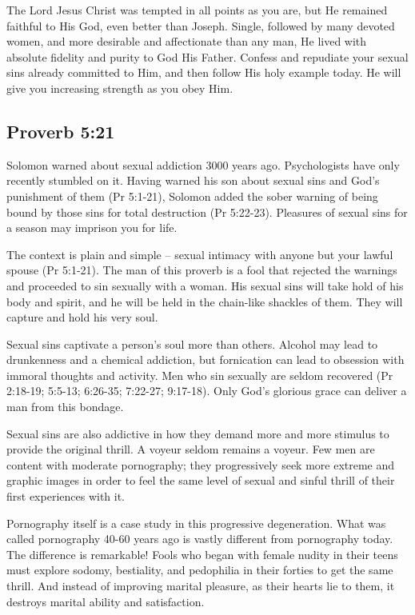 The Lord Jesus Christ was tempted in all points as you are, but He remained faithful to His God, even better than Joseph. Single, followed by many devoted women, and more desirable and affectionate than any man, He lived with absolute fidelity and purity to God His Father. Confess and repudiate your sexual sins already committed to Him, and then follow His holy example today. He will give you increasing strength as you obey Him.

\subsection{Proverb 5:21}
Solomon warned about sexual addiction 3000 years ago. Psychologists have only recently stumbled on it. Having warned his son about sexual sins and God’s punishment of them (Pr 5:1-21), Solomon added the sober warning of being bound by those sins for total destruction (Pr 5:22-23). Pleasures of sexual sins for a season may imprison you for life.

The context is plain and simple – sexual intimacy with anyone but your lawful spouse (Pr 5:1-21). The man of this proverb is a fool that rejected the warnings and proceeded to sin sexually with a woman. His sexual sins will take hold of his body and spirit, and he will be held in the chain-like shackles of them. They will capture and hold his very soul.

Sexual sins captivate a person’s soul more than others. Alcohol may lead to drunkenness and a chemical addiction, but fornication can lead to obsession with immoral thoughts and activity. Men who sin sexually are seldom recovered (Pr 2:18-19; 5:5-13; 6:26-35; 7:22-27; 9:17-18). Only God’s glorious grace can deliver a man from this bondage.

Sexual sins are also addictive in how they demand more and more stimulus to provide the original thrill. A voyeur seldom remains a voyeur. Few men are content with moderate pornography; they progressively seek more extreme and graphic images in order to feel the same level of sexual and sinful thrill of their first experiences with it.

Pornography itself is a case study in this progressive degeneration. What was called pornography 40-60 years ago is vastly different from pornography today. The difference is remarkable! Fools who began with female nudity in their teens must explore sodomy, bestiality, and pedophilia in their forties to get the same thrill. And instead of improving marital pleasure, as their hearts lie to them, it destroys marital ability and satisfaction.

